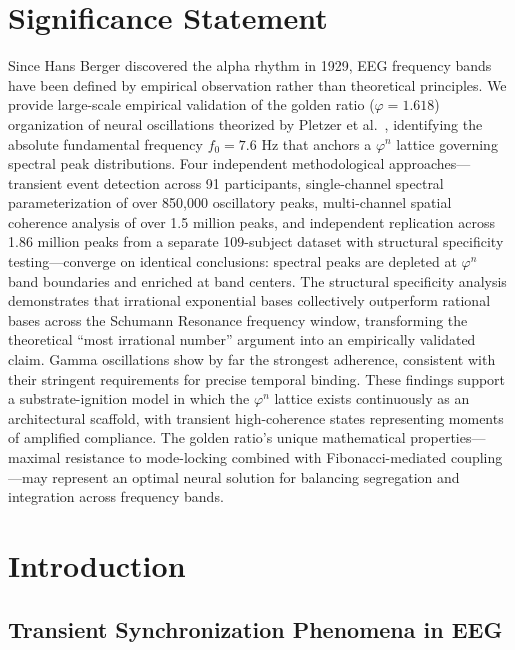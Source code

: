 \documentclass[11pt,a4paper]{article}
\newcommand{\phisym}{\varphi}
\begin{document}
\section*{Significance Statement}
Since Hans Berger discovered the alpha rhythm in 1929, EEG frequency bands have been defined by empirical observation rather than theoretical principles. We provide large-scale empirical validation of the golden ratio ($\phisym = 1.618$) organization of neural oscillations theorized by Pletzer et al.\ \parencite{pletzer2010golden}, identifying the absolute fundamental frequency $f_0 = 7.6$ Hz that anchors a $\phisym^n$ lattice governing spectral peak distributions. Four independent methodological approaches---transient event detection across 91 participants, single-channel spectral parameterization of over 850,000 oscillatory peaks, multi-channel spatial coherence analysis of over 1.5 million peaks, and independent replication across 1.86 million peaks from a separate 109-subject dataset with structural specificity testing---converge on identical conclusions: spectral peaks are depleted at $\phisym^n$ band boundaries and enriched at band centers. The structural specificity analysis demonstrates that irrational exponential bases collectively outperform rational bases across the Schumann Resonance frequency window, transforming the theoretical ``most irrational number'' argument into an empirically validated claim. Gamma oscillations show by far the strongest adherence, consistent with their stringent requirements for precise temporal binding. These findings support a substrate-ignition model in which the $\phisym^n$ lattice exists continuously as an architectural scaffold, with transient high-coherence states representing moments of amplified compliance. The golden ratio's unique mathematical properties---maximal resistance to mode-locking combined with Fibonacci-mediated coupling---may represent an optimal neural solution for balancing segregation and integration across frequency bands.

\newpage
\tableofcontents
\newpage

\section{Introduction}

\subsection{Transient Synchronization Phenomena in EEG}
\end{document}
